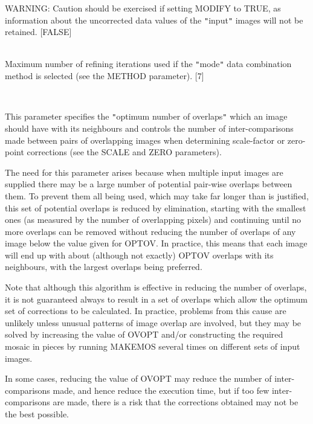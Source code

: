 \documentclass[twoside,11pt]{article}
\renewcommand{\_}{\texttt{\symbol{95}}}
\newcommand{\qt}[1]{{\tt "}#1{\tt "}}
\newcommand{\routine}[1]{{\sc #1}}
\newcommand{\sstsubsection}[1]{ \item[{#1}] \mbox{} \\}
\newcommand{\sstsubsection}[1]{\item[{#1}]}
\begin{document}
{{{         WARNING: Caution should be exercised if setting MODIFY to
         TRUE, as information about the uncorrected data values of the
         \qt{input} images will not be retained.
         [FALSE]
      }
      \sstsubsection{
         NITER = \_REAL (Read)
      } {
         Maximum number of refining iterations used if the \qt{mode} data
         combination method is selected (see the METHOD parameter).
         [7]
      }
      \sstsubsection{
         OPTOV = \_INTEGER (Read)
      } {
         This parameter specifies the \qt{optimum number of overlaps}
         which an image should have with its neighbours and controls the
         number of inter-comparisons made between pairs of overlapping
         images when determining scale-factor or zero-point corrections
         (see the SCALE and ZERO parameters).

         The need for this parameter arises because when multiple input
         images are supplied there may be a large number of potential
         pair-wise overlaps between them.  To prevent them all being
         used, which may take far longer than is justified, this set of
         potential overlaps is reduced by elimination, starting with
         the smallest ones (as measured by the number of overlapping
         pixels) and continuing until no more overlaps can be removed
         without reducing the number of overlaps of any image below the
         value given for OPTOV.  In practice, this means that each image
         will end up with about (although not exactly) OPTOV overlaps
         with its neighbours, with the largest overlaps being
         preferred.

         Note that although this algorithm is effective in reducing the
         number of overlaps, it is not guaranteed always to result in a
         set of overlaps which allow the optimum set of corrections to
         be calculated. In practice, problems from this cause are
         unlikely unless unusual patterns of image overlap are involved,
         but they may be solved by increasing the value of OVOPT and/or
         constructing the required mosaic in pieces by running \routine{MAKEMOS}
         several times on different sets of input images.

         In some cases, reducing the value of OVOPT may reduce the
         number of inter-comparisons made, and hence reduce the
         execution time, but if too few inter-comparisons are made,
         there is a risk that the corrections obtained may not be the
         best possible.

}}}
\end{document}
